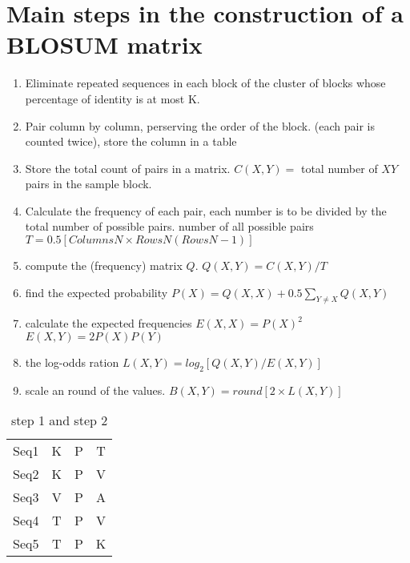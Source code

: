 \documentclass[11pt]{article}
\begin{document}
\section{Main steps in the construction of a BLOSUM matrix} %
\label{sec:main_steps_in_the_construction_of_a_blosum_matrix}
\begin{enumerate}
	\item Eliminate repeated sequences in each block of the cluster of blocks whose percentage of identity is at most K.
	\item Pair column by column, perserving the order of the block. (each pair is counted twice), store the column in a table 
	\item Store the total count of pairs in a matrix. $C(X,Y) = $ total number of $XY$ pairs in the sample block.
	\item Calculate the frequency of each pair, each number is to be divided by the total number of possible pairs. number of all possible pairs $T =  0.5[ColumnsN \times RowsN(RowsN-1)]$ 
	\item compute the (frequency) matrix $Q$. $Q(X, Y) = C(X,Y)/ T$ 
	\item find the expected probability $P(X) = Q(X, X) + 0.5 \sum_{Y \neq   X} Q(X,Y)$
	\item calculate the expected frequencies $E(X,X) = P(X)^2$ $E(X,Y) = 2P(X)P(Y)$
	\item the log-odds ration $L(X,Y) = log_2[Q(X,Y)/E(X,Y)]$
	\item scale an round of the values.  $B(X,Y) = round[2 \times L(X,Y)]$
\end{enumerate}

\begin{table}[ht]
	\caption{step 1 and step 2}
	\label{tab:tablename}
	\centering

	\begin{tabular}{l|ccc}
	\hline

	\hline
		Seq1 & K & P & T\\
		Seq2 & K & P & V\\
		Seq3 & V & P & A\\
		Seq4 & T & P & V\\
		Seq5 & T & P & K\\
	\hline

	\hline
	\end{tabular}
\end{table}
\end{document}
